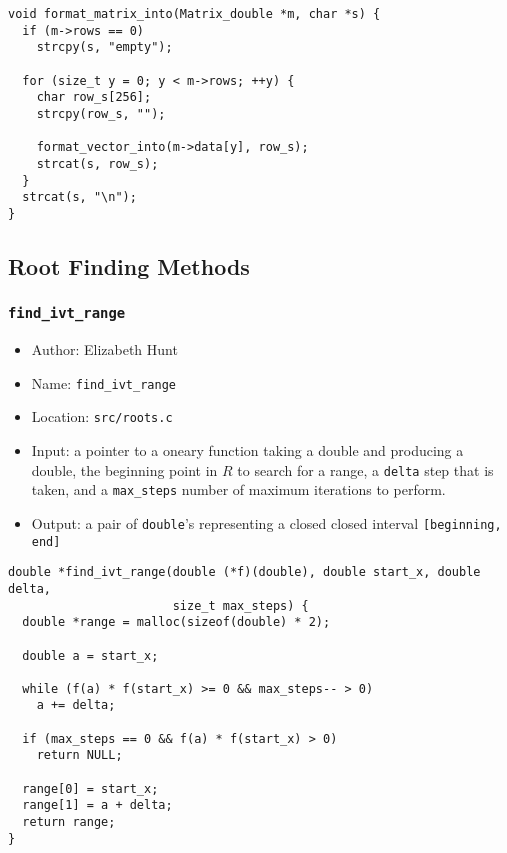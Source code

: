 \documentclass[11pt]{article}
\begin{document}
\begin{verbatim}
void format_matrix_into(Matrix_double *m, char *s) {
  if (m->rows == 0)
    strcpy(s, "empty");

  for (size_t y = 0; y < m->rows; ++y) {
    char row_s[256];
    strcpy(row_s, "");

    format_vector_into(m->data[y], row_s);
    strcat(s, row_s);
  }
  strcat(s, "\n");
}
\end{verbatim}
\subsection{Root Finding Methods}
\label{sec:org6c22e6c}
\subsubsection{\texttt{find\_ivt\_range}}
\label{sec:org43ba5e5}
\begin{itemize}
\item Author: Elizabeth Hunt
\item Name: \texttt{find\_ivt\_range}
\item Location: \texttt{src/roots.c}
\item Input: a pointer to a oneary function taking a double and producing a double, the beginning point
in \(R\) to search for a range, a \texttt{delta} step that is taken, and a \texttt{max\_steps} number of maximum
iterations to perform.
\item Output: a pair of \texttt{double}'s representing a closed closed interval \texttt{[beginning, end]}
\end{itemize}

\begin{verbatim}
double *find_ivt_range(double (*f)(double), double start_x, double delta,
                       size_t max_steps) {
  double *range = malloc(sizeof(double) * 2);

  double a = start_x;

  while (f(a) * f(start_x) >= 0 && max_steps-- > 0)
    a += delta;

  if (max_steps == 0 && f(a) * f(start_x) > 0)
    return NULL;

  range[0] = start_x;
  range[1] = a + delta;
  return range;
}
\end{verbatim}
\end{document}
